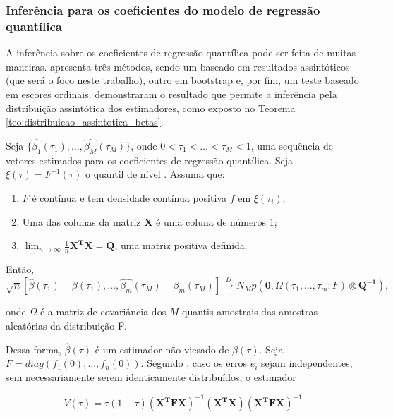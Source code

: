 \subsubsection{Inferência para os coeficientes do modelo de regressão quantílica}
A inferência sobre os coeficientes de regressão quantílica pode ser feita de muitas maneiras.  apresenta três métodos, sendo um baseado em resultados assintóticos (que será o foco neste trabalho), outro em bootstrap e, por fim, um teste baseado em escores ordinais.  demonstraram o resultado que permite a inferência pela distribuição assintótica dos estimadores, como exposto no Teorema \ref{teo:distribuicao_assintotica_betas}.


\begin{teo}
\label{teo:distribuicao_assintotica_betas}

Seja $\{\hat{\beta_1}(\tau_1), \dots, \hat{\beta_M}(\tau_M)\}$, onde $0 < \tau_1 < \dots < \tau_M < 1$, uma sequência de vetores estimados para os coeficientes de regressão quantílica. Seja $\mathbb{\xi}(\tau) = F^{-1}(\tau)$ o quantil de nível \tau. Assuma que:

\begin{enumerate}
    \item $F$ é contínua e tem densidade contínua positiva $f$ em $\xi(\tau_i)$;
    \item Uma das colunas da matriz $\mathbf{X}$ é uma coluna de números 1;
    \item $\displaystyle \lim_{n\to\infty} \frac{1}{n}\mathbf{X^TX = Q}$, uma matriz positiva definida.

\end{enumerate}


Então,
$$\sqrt{n} [\hat{\beta}(\tau_1) - \beta(\tau_1), \dots, \hat{\beta_m}(\tau_M) - \beta_m(\tau_M)] \xrightarrow{D} N_M p(\mathbf{0}, \Omega(\tau_1, \dots, \tau_m; F) \otimes \mathbf{Q^{-1}}),$$

\noindent onde $\Omega$ é a matriz de covariância dos $M$ quantis amostrais das amostras aleatórias da distribuição F.

\end{teo}


Dessa forma, $\hat{\beta}(\tau)$ é um estimador não-viesado de $\beta(\tau)$. Seja $F = diag(f_1(0), \dots, f_n(0))$. Segundo , caso os erros $e_i$ sejam independentes, sem necessariamente serem identicamente distribuídos, o estimador  

\begin{equation}
V(\tau) = \tau (1 - \tau )\mathbf{(X ^ T F X) ^{-1} (X ^ T X)(X ^ T F X) ^ {-1}}
\label{equation:asympt_var_beta}
\end{equation}

